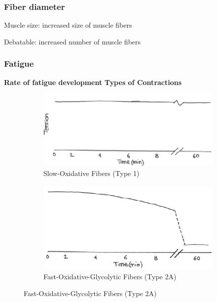 \documentclass[11pt,fleqn]{book}
\begin{document}
\subsubsection{Fiber diameter}
\begin{descriptions}
    \item[Muscle size: ]increased size of muscle fibers
    \item[Debatable: ]increased number of muscle fibers 
\end{descriptions}

\subsubsection{Fatigue}
\textbf{Rate of fatigue development}
\textbf{Types of Contractions}
\begin{figure}[h!]
    \centering
    \begin{subfigure}{0.45\textwidth}
        \includegraphics[width=\textwidth]{Pictures/Screenshot 2024-04-03 231435.png}
        \caption{Slow-Oxidative Fibers
(Type 1)}
    \end{subfigure}
    \hfill
    \begin{subfigure}{0.45\textwidth}
        \includegraphics[width=\textwidth]{Pictures/Screenshot 2024-04-03 231440.png}
        \caption{Fast-Oxidative-Glycolytic Fibers
(Type 2A)}
    \end{subfigure}

\end{figure}
\end{document}

